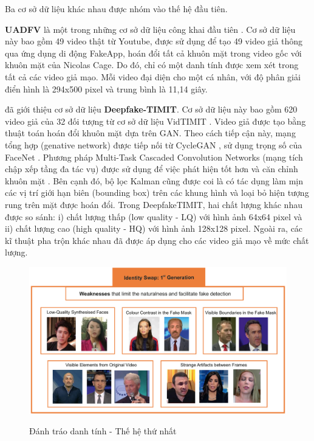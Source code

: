 \documentclass{article}
\begin{document}
Ba cơ sở dữ liệu khác nhau được nhóm vào thế hệ đầu tiên.

\textbf{UADFV} là một trong những cơ sở dữ liệu công khai đầu tiên . Cơ sở dữ liệu này bao gồm 49 video thật từ Youtube, được sử dụng để tạo 49 video giả thông qua ứng dụng di động FakeApp, hoán đổi tất cả khuôn mặt trong video gốc với khuôn mặt của Nicolas Cage. Do đó, chỉ có một danh tính được xem xét trong tất cả các video giả mạo. Mỗi video đại diện cho một cá nhân, với độ phân giải điển hình là 294x500 pixel và trung bình là 11,14 giây.

 đã giới thiệu cơ sở dữ liệu \textbf{Deepfake-TIMIT}. Cơ sở dữ liệu này bao gồm 620 video giả của 32 đối tượng từ cơ sở dữ liệu VidTIMIT . Video giả được tạo bằng thuật toán hoán đổi khuôn mặt dựa trên GAN. Theo cách tiếp cận này, mạng tổng hợp (genative network) được tiếp nối từ CycleGAN , sử dụng trọng số của FaceNet . Phương pháp Multi-Task Cascaded Convolution Networks (mạng tích chập xếp tầng đa tác vụ) được sử dụng để việc phát hiện tốt hơn và căn chỉnh khuôn mặt . Bên cạnh đó, bộ lọc Kalman cũng được coi là có tác dụng làm mịn các vị trí giới hạn biên (bounding box) trên các khung hình và loại bỏ hiện tượng rung trên mặt được hoán đổi. Trong DeepfakeTIMIT, hai chất lượng khác nhau được so sánh: i) chất lượng thấp (low quality - LQ) với hình ảnh 64x64 pixel và ii) chất lượng cao (high quality - HQ) với hình ảnh 128x128 pixel. Ngoài ra, các kĩ thuật pha trộn khác nhau đã được áp dụng cho các video giả mạo về mức chất lượng.

\begin{figure}[h!]
\caption{Đánh tráo danh tính - Thế hệ thứ nhất}
\includegraphics[width=\textwidth]{fig-3-id-swap-gen1}
\label{fig-3-id-swap-gen1}
\end{figure}
\end{document}
